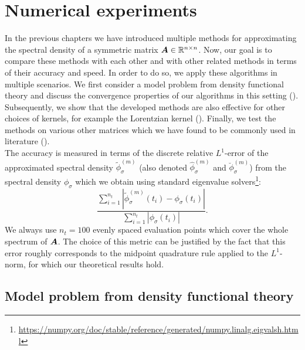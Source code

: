 \chapter{Numerical experiments}
\label{chp:5-experiments}

In the previous chapters we have introduced multiple methods for approximating the
spectral density of a symmetric matrix $\boldsymbol{A} \in \mathbb{R}^{n \times n}$. Now,
our goal is to compare these methods with each other and with other related methods
in terms of their accuracy and speed. In order to do so, we apply these algorithms
in multiple scenarios. We first consider a model problem from density functional theory
\cite{lin2017randomized} and discuss the convergence properties of our algorithms
in this setting (). Subsequently,
we show that the developed methods are also effective for other choices of
kernels, for example the Lorentzian kernel ().
Finally, we test the methods on various other matrices which we have found to
be commonly used in literature ().\\

The accuracy is measured in terms of the discrete relative $L^1$-error of the approximated
spectral density $\widetilde{\phi}_{\sigma}^{(m)}$ (also denoted $\widehat{\phi}_{\sigma}^{(m)}$ and
$\breve{\phi}_{\sigma}^{(m)}$) from the spectral density $\phi_{\sigma}$
which we obtain using standard eigenvalue solvers\footnote{\url{https://numpy.org/doc/stable/reference/generated/numpy.linalg.eigvalsh.html}}:
\begin{equation}
    \frac{\sum_{i=1}^{n_t} |\widetilde{\phi}_{\sigma}^{(m)}(t_i) - \phi_{\sigma}(t_i)|}{\sum_{i=1}^{n_t} |\phi_{\sigma}(t_i)|}.
    \label{equ:5-experiments-L1-error}
\end{equation}
We always use $n_t=100$ evenly spaced evaluation points which cover the whole spectrum of
$\boldsymbol{A}$. The choice of this metric can be justified by the fact that this
error roughly corresponds to the midpoint quadrature rule \cite[chapter~9.2.1]{quarteroni2007numerical}
applied to the $L^1$-norm, for which our theoretical results hold.


\section{Model problem from density functional theory}
\label{sec:5-experiments-density-function}

